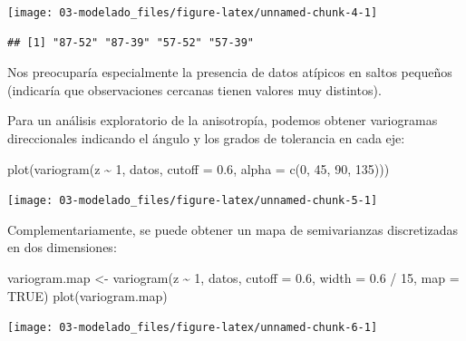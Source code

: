 \documentclass[
  spanish,
]{book}
\newenvironment{Shaded}{\begin{snugshade}}{\end{snugshade}}
\newcommand{\AttributeTok}[1]{\textcolor[rgb]{0.77,0.63,0.00}{#1}}
\newcommand{\ConstantTok}[1]{\textcolor[rgb]{0.00,0.00,0.00}{#1}}
\newcommand{\DecValTok}[1]{\textcolor[rgb]{0.00,0.00,0.81}{#1}}
\newcommand{\FloatTok}[1]{\textcolor[rgb]{0.00,0.00,0.81}{#1}}
\newcommand{\FunctionTok}[1]{\textcolor[rgb]{0.00,0.00,0.00}{#1}}
\newcommand{\NormalTok}[1]{#1}
\newcommand{\OtherTok}[1]{\textcolor[rgb]{0.56,0.35,0.01}{#1}}
\newcommand{\SpecialCharTok}[1]{\textcolor[rgb]{0.00,0.00,0.00}{#1}}
\theoremstyle{break}
\theoremstyle{definition}
\theoremstyle{definition}
\theoremstyle{definition}
\theoremstyle{definition}
\theoremstyle{remark}
\begin{document}
\begin{center}\texttt{[image: 03-modelado\_files/figure-latex/unnamed-chunk-4-1]} \end{center}

\begin{verbatim}
## [1] "87-52" "87-39" "57-52" "57-39"
\end{verbatim}

Nos preocuparía especialmente la presencia de datos atípicos en saltos pequeños (indicaría que observaciones cercanas tienen valores muy distintos).

Para un análisis exploratorio de la anisotropía, podemos obtener variogramas direccionales indicando el ángulo y los grados de tolerancia en cada eje:

\begin{Shaded}
\begin{Highlighting}[]
\FunctionTok{plot}\NormalTok{(}\FunctionTok{variogram}\NormalTok{(z }\SpecialCharTok{\textasciitilde{}} \DecValTok{1}\NormalTok{, datos, }\AttributeTok{cutoff =} \FloatTok{0.6}\NormalTok{, }\AttributeTok{alpha =} \FunctionTok{c}\NormalTok{(}\DecValTok{0}\NormalTok{, }\DecValTok{45}\NormalTok{, }\DecValTok{90}\NormalTok{, }\DecValTok{135}\NormalTok{)))}
\end{Highlighting}
\end{Shaded}

\begin{center}\texttt{[image: 03-modelado\_files/figure-latex/unnamed-chunk-5-1]} \end{center}

Complementariamente, se puede obtener un mapa de semivarianzas discretizadas en dos dimensiones:

\begin{Shaded}
\begin{Highlighting}[]
\NormalTok{variogram.map }\OtherTok{\textless{}{-}} \FunctionTok{variogram}\NormalTok{(z }\SpecialCharTok{\textasciitilde{}} \DecValTok{1}\NormalTok{, datos, }\AttributeTok{cutoff =} \FloatTok{0.6}\NormalTok{, }\AttributeTok{width =} \FloatTok{0.6} \SpecialCharTok{/} \DecValTok{15}\NormalTok{, }\AttributeTok{map =} \ConstantTok{TRUE}\NormalTok{)}
\FunctionTok{plot}\NormalTok{(variogram.map)}
\end{Highlighting}
\end{Shaded}

\begin{center}\texttt{[image: 03-modelado\_files/figure-latex/unnamed-chunk-6-1]} \end{center}
\end{document}
